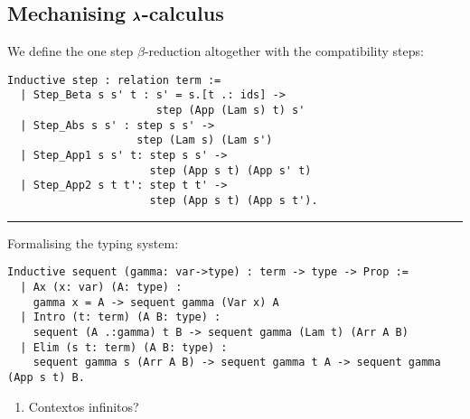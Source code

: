 \subsection{Mechanising $\pmb{\lambda}$-calculus}

We define the one step $\beta$-reduction altogether with the compatibility steps:
\begin{lstlisting}[language=Coq]
  Inductive step : relation term :=
  | Step_Beta s s' t : s' = s.[t .: ids] ->
                       step (App (Lam s) t) s'
  | Step_Abs s s' : step s s' ->
                    step (Lam s) (Lam s')
  | Step_App1 s s' t: step s s' ->
                      step (App s t) (App s' t)
  | Step_App2 s t t': step t t' ->
                      step (App s t) (App s t').
\end{lstlisting}

\vspace{2em} \hrule \vspace{2em}

Formalising the typing system:

\begin{lstlisting}[language=Coq]
  Inductive sequent (gamma: var->type) : term -> type -> Prop := 
  | Ax (x: var) (A: type) :
    gamma x = A -> sequent gamma (Var x) A
  | Intro (t: term) (A B: type) :
    sequent (A .:gamma) t B -> sequent gamma (Lam t) (Arr A B)
  | Elim (s t: term) (A B: type) :
    sequent gamma s (Arr A B) -> sequent gamma t A -> sequent gamma (App s t) B.
\end{lstlisting}

\begin{enumerate}
\item Contextos infinitos?
\end{enumerate}

